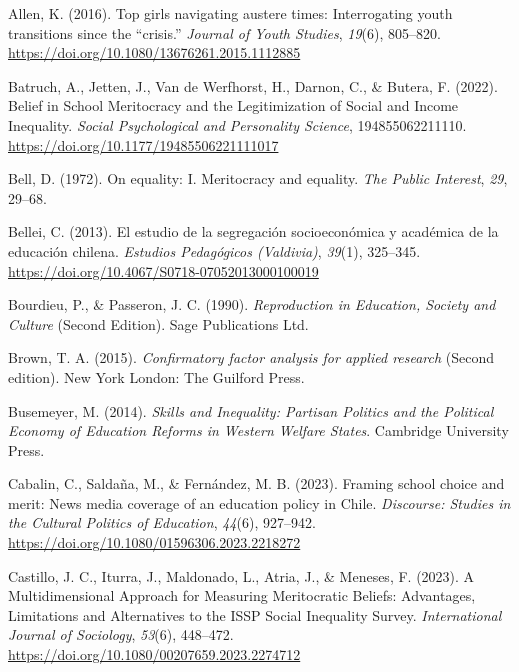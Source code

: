 \documentclass[
  13pt,
]{article}
\newlength{\cslhangindent}
\newenvironment{CSLReferences}[2] %
 {\begin{list}{}{%
  \setlength{\itemindent}{0pt}
  \setlength{\leftmargin}{0pt}
  \setlength{\parsep}{0pt}
  \ifodd #1
   \setlength{\leftmargin}{\cslhangindent}
   \setlength{\itemindent}{-1\cslhangindent}
  \fi
  \setlength{\itemsep}{#2\baselineskip}}}
 {\end{list}}
\begin{document}
\label{refs}
\begin{CSLReferences}{1}{0}
Allen, K. (2016). Top girls navigating austere times: Interrogating
youth transitions since the {``crisis.''} \emph{Journal of Youth
Studies}, \emph{19}(6), 805--820.
\url{https://doi.org/10.1080/13676261.2015.1112885}

Batruch, A., Jetten, J., Van de Werfhorst, H., Darnon, C., \& Butera, F.
(2022). Belief in {School Meritocracy} and the {Legitimization} of
{Social} and {Income Inequality}. \emph{Social Psychological and
Personality Science}, 194855062211110.
\url{https://doi.org/10.1177/19485506221111017}

Bell, D. (1972). On equality: {I}. {Meritocracy} and equality. \emph{The
Public Interest}, \emph{29}, 29--68.

Bellei, C. (2013). El estudio de la segregación socioeconómica y
académica de la educación chilena. \emph{Estudios Pedagógicos
(Valdivia)}, \emph{39}(1), 325--345.
\url{https://doi.org/10.4067/S0718-07052013000100019}

Bourdieu, P., \& Passeron, J. C. (1990). \emph{Reproduction in
{Education}, {Society} and {Culture}} (Second Edition). Sage
Publications Ltd.

Brown, T. A. (2015). \emph{Confirmatory factor analysis for applied
research} (Second edition). New York London: The Guilford Press.

Busemeyer, M. (2014). \emph{Skills and {Inequality}: {Partisan Politics}
and the {Political Economy} of {Education Reforms} in {Western Welfare
States}}. Cambridge University Press.

Cabalin, C., Saldaña, M., \& Fernández, M. B. (2023). Framing school
choice and merit: News media coverage of an education policy in {Chile}.
\emph{Discourse: Studies in the Cultural Politics of Education},
\emph{44}(6), 927--942.
\url{https://doi.org/10.1080/01596306.2023.2218272}

Castillo, J. C., Iturra, J., Maldonado, L., Atria, J., \& Meneses, F.
(2023). A {Multidimensional Approach} for {Measuring Meritocratic
Beliefs}: {Advantages}, {Limitations} and {Alternatives} to the {ISSP
Social Inequality Survey}. \emph{International Journal of Sociology},
\emph{53}(6), 448--472.
\url{https://doi.org/10.1080/00207659.2023.2274712}


\end{CSLReferences}
\end{document}
